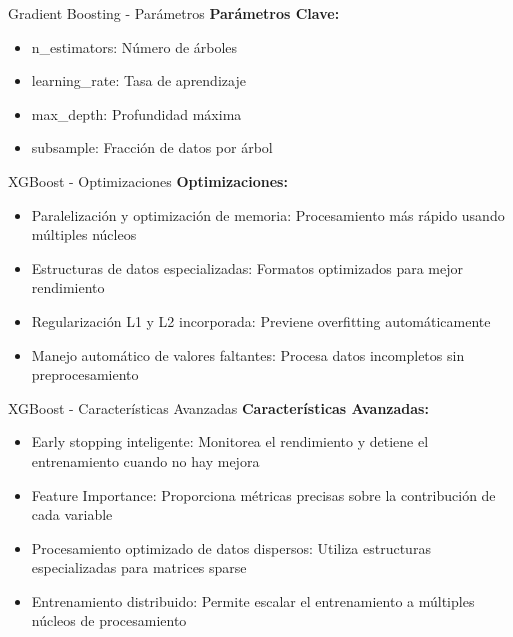\documentclass{beamer}
\begin{document}
\begin{frame}{Gradient Boosting - Parámetros}
    \textbf{Parámetros Clave:}
    \begin{itemize}
        \item<2-> n\_estimators: Número de árboles
        \item<3-> learning\_rate: Tasa de aprendizaje
        \item<4-> max\_depth: Profundidad máxima
        \item<5-> subsample: Fracción de datos por árbol
    \end{itemize}
\end{frame}

\begin{frame}{XGBoost - Optimizaciones}
    \textbf{Optimizaciones:}
    \begin{itemize}
        \item<2-> Paralelización y optimización de memoria: Procesamiento más rápido usando múltiples núcleos
        \item<3-> Estructuras de datos especializadas: Formatos optimizados para mejor rendimiento
        \item<4-> Regularización L1 y L2 incorporada: Previene overfitting automáticamente
        \item<5-> Manejo automático de valores faltantes: Procesa datos incompletos sin preprocesamiento
    \end{itemize}
\end{frame}

\begin{frame}{XGBoost - Características Avanzadas}
    \textbf{Características Avanzadas:}
    \begin{itemize}
        \item<2-> Early stopping inteligente: Monitorea el rendimiento y detiene el entrenamiento cuando no hay mejora
        \item<3-> Feature Importance: Proporciona métricas precisas sobre la contribución de cada variable
        \item<4-> Procesamiento optimizado de datos dispersos: Utiliza estructuras especializadas para matrices sparse
        \item<5-> Entrenamiento distribuido: Permite escalar el entrenamiento a múltiples núcleos de procesamiento
    \end{itemize}
\end{frame}
\end{document}

